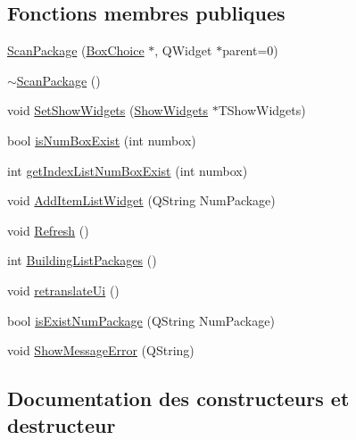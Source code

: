\subsection*{Fonctions membres publiques}
\begin{DoxyCompactItemize}
\item 
\hyperlink{class_scan_package_abb814e86d814ec00b3298e016f681078}{Scan\+Package} (\hyperlink{class_box_choice}{Box\+Choice} $\ast$, Q\+Widget $\ast$parent=0)
\item 
\hyperlink{class_scan_package_ac9415024f9e95616a492d945163879bb}{$\sim$\+Scan\+Package} ()
\item 
void \hyperlink{class_scan_package_a83de045614e54fd0cd27e880fde91bbd}{Set\+Show\+Widgets} (\hyperlink{class_show_widgets}{Show\+Widgets} $\ast$T\+Show\+Widgets)
\item 
bool \hyperlink{class_scan_package_a28b1aa9f91853542a98de87b81d21bd1}{is\+Num\+Box\+Exist} (int numbox)
\item 
int \hyperlink{class_scan_package_aad38eab330e03b60c96ed5b6411fa975}{get\+Index\+List\+Num\+Box\+Exist} (int numbox)
\item 
void \hyperlink{class_scan_package_a565dbb7397d7dd780f4870d83a15b906}{Add\+Item\+List\+Widget} (Q\+String Num\+Package)
\item 
void \hyperlink{class_scan_package_a201dadb61959395c6e9d0ad8f90fbb39}{Refresh} ()
\item 
int \hyperlink{class_scan_package_ae163c531d240273368c8ccb63972a8b8}{Building\+List\+Packages} ()
\item 
void \hyperlink{class_scan_package_ac3ea867a79d0550db3476c46bc6e4178}{retranslate\+Ui} ()
\item 
bool \hyperlink{class_scan_package_ac9d9da0a233dad4464f0cdf1c02991a5}{is\+Exist\+Num\+Package} (Q\+String Num\+Package)
\item 
void \hyperlink{class_scan_package_a9d068b492d0d49abb0cbdcad9d1fe203}{Show\+Message\+Error} (Q\+String)
\end{DoxyCompactItemize}


\subsection{Documentation des constructeurs et destructeur}
\hypertarget{class_scan_package_abb814e86d814ec00b3298e016f681078}{}
